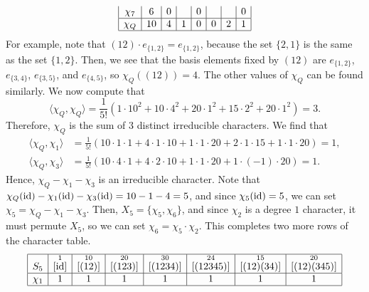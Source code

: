 \begin{exmp}{}
\begin{align*}
\begin{array}{|c|c|c|c|c|c|c|c|}
            \chi_7 & 6                  & 0                    &                       & 0                      &                         &                          & 0                         \\ \hline
            \chi_Q & 10                 & 4                    & 1                     & 0                      & 0                       & 2                        & 1                         \\ \hline 
        \end{array} 
    \end{align*}
    For example, note that $(12) \cdot e_{\{1,2\}} 
    = e_{\{1,2\}}$, because the set $\{2, 1\}$ is the same as the set $\{1, 2\}$. 
    Then, we see that the basis elements fixed by $(12)$ are $e_{\{1,2\}}$, 
    $e_{\{3,4\}}$, $e_{\{3,5\}}$, and $e_{\{4,5\}}$, so $\chi_Q((12)) = 4$. 
    The other values of $\chi_Q$ can be found similarly. We now compute that 
    \[ \langle \chi_Q, \chi_Q \rangle = \frac1{5!}(1 \cdot 10^2 
    + 10 \cdot 4^2 + 20 \cdot 1^2 + 15 \cdot 2^2 + 20 \cdot 1^2) = 3. \] 
    Therefore, $\chi_Q$ is the sum of $3$ distinct irreducible characters. 
    We find that 
    \begin{align*}
        \langle \chi_Q, \chi_1 \rangle &= \frac1{5!}(10 \cdot 1 \cdot 1 
        + 4 \cdot 1 \cdot 10 + 1 \cdot 1 \cdot 20 + 2 \cdot 1 \cdot 15 
        + 1 \cdot 1 \cdot 20) = 1, \\ 
        \langle \chi_Q, \chi_3 \rangle &= \frac1{5!}(10 \cdot 4 \cdot 1 
        + 4 \cdot 2 \cdot 10 + 1 \cdot 1 \cdot 20 + 1 \cdot (-1) \cdot 20) = 1. 
    \end{align*}
    Hence, $\chi_Q - \chi_1 - \chi_3$ is an irreducible character. 
    Note that $\chi_Q(\operatorname{id}) - \chi_1(\operatorname{id}) - \chi_3(\operatorname{id}) = 10 - 1 - 4 = 5$, and 
    since $\chi_5(\operatorname{id}) = 5$, we can set $\chi_5 = \chi_Q - \chi_1 - \chi_3$. 
    Then, $X_5 = \{\chi_5, \chi_6\}$, and since $\chi_2$ is a degree $1$ 
    character, it must permute $X_5$, so we can set $\chi_6 = \chi_5 \cdot \chi_2$. 
    This completes two more rows of the character table. 
    \begin{align*}
        \begin{array}{|c|c|c|c|c|c|c|c|}
            \hline
            S_5    & \overset{1}{[\operatorname{id}]} & \overset{10}{[(12)]} & \overset{20}{[(123)]} & \overset{30}{[(1234)]} & \overset{24}{[(12345)]} & \overset{15}{[(12)(34)]} & \overset{20}{[(12)(345)]} \\ \hline
            \chi_1 & 1                  & 1                    & 1                     & 1                      & 1                       & 1                        & 1                         \\ \hline

\end{array}
\end{align*}
\end{exmp}
